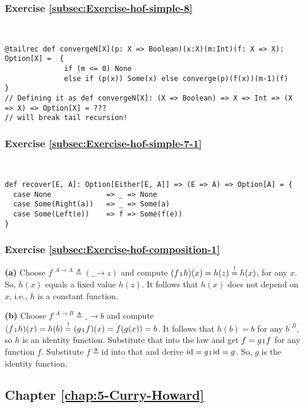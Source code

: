 \subsubsection*{Exercise \ref{subsec:Exercise-hof-simple-8}}

~
\begin{lstlisting}
@tailrec def convergeN[X](p: X => Boolean)(x:X)(m:Int)(f: X => X): Option[X] =  {
              if (m <= 0) None
              else if (p(x)) Some(x) else converge(p)(f(x))(m-1)(f)             }
// Defining it as def convergeN[X]: (X => Boolean) => X => Int => (X => X) => Option[X] = ???
// will break tail recursion!
\end{lstlisting}


\subsubsection*{Exercise \ref{subsec:Exercise-hof-simple-7-1}}

~
\begin{lstlisting}
def recover[E, A]: Option[Either[E, A]] => (E => A) => Option[A] = {
  case None             => _ => None
  case Some(Right(a))   => _ => Some(a)
  case Some(Left(e))    => f => Some(f(e))
}
\end{lstlisting}


\subsubsection*{Exercise \ref{subsec:Exercise-hof-composition-1}}

\textbf{(a)} Choose $f^{:A\rightarrow A}\triangleq(\_\rightarrow z)$
and compute $(f\bef h)(x)=h(z)\overset{!}{=}h(x)$, for any $x$.
So, $h(x)$ equals a fixed value $h(z)$. It follows that $h(x)$
does not depend on $x$, i.e., $h$ is a constant function.

\textbf{(b)} Choose $f^{:A\rightarrow B}\triangleq\_\rightarrow b$
and compute $(f\bef h)(x)=h(b)\overset{!}{=}(g\bef f)(x)=f(g(x))=b$.
It follows that $h(b)=b$ for any $b^{:B}$, so $h$ is an identity
function. Substitute that into the law and get $f=g\bef f$ for any
function $f$. Substitute $f\triangleq\text{id}$ into that and derive
$\text{id}=g\bef\text{id}=g$. So, $g$ is the identity function.

\subsection*{Chapter \ref{chap:5-Curry-Howard}}

